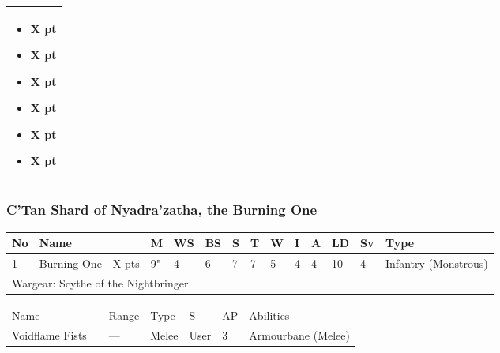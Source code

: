 \begin{tabular}{||m{532pt}||}
\begin{itemize}
		\item \quickref{Seismic Assault} \hrulefill X pt
		\item \quickref{Sky of Falling Stars} \hrulefill X pt
		\item \quickref{Swarm of Spirit Dust} \hrulefill X pt
		\item \quickref{Time's Arrow} \hrulefill X pt
		\item \quickref{Transdimensional Thunderbolt} \hrulefill X pt
		\item \quickref{Withering Worldscape} \hrulefill X pt
	\end{itemize} \\
	\hline
\end{tabular}




\newpage
\subsubsection{C'Tan Shard of Nyadra'zatha, the Burning One}

\noindent
\begin{tabular}{||m{10pt} m{95pt} m{30pt} m{11pt} m{11pt} m{11pt} m{11pt} m{11pt} m{11pt} m{11pt} m{11pt} m{11pt} m{11pt} m{125pt}||}
	\hline
	No & Name & & M & WS & BS & S & T & W & I & A & LD & Sv & Type \\
	\hline
	1 & Burning One & X pts & 9" & 4 & 6 & 7 & 7 & 5 & 4 & 4 & 10 & 4+ & Infantry (Monstrous)\\
	\hline
	\hline
	\multicolumn{14}{||Z{532 pt}||}{Wargear: Scythe of the Nightbringer}\\
	\hline
\end{tabular}

\noindent
\begin{tabular}{||m{140pt} m{0pt} m{31pt} m{55pt} m{12pt} m{12pt} m{210pt}||}
	\hline
	Name & & Range & Type & S & AP & Abilities \\
	Voidflame Fists & & — & Melee & User & 3 & Armourbane (Melee) \\
	\hline	
	\hline
\end{tabular}

